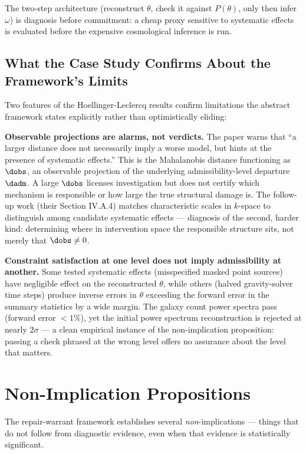 \documentclass[12pt,a4paper,twoside,openright]{book}
\theoremstyle{plain}
\theoremstyle{definition}
\theoremstyle{remark}
\begin{document}
The two-step architecture (reconstruct $\theta$, check it against $P(\theta)$, only then infer $\omega$) is diagnosis before commitment: a cheap proxy sensitive to systematic effects is evaluated before the expensive cosmological inference is run.

\subsection{What the Case Study Confirms About the Framework's Limits}

Two features of the Hoellinger-Leclercq results confirm limitations the abstract framework states explicitly rather than optimistically eliding:

\textbf{Observable projections are alarms, not verdicts.} The paper warns that ``a larger distance does not necessarily imply a worse model, but hints at the presence of systematic effects.'' This is the Mahalanobis distance functioning as $\dobs$, an observable projection of the underlying admissibility-level departure $\dadm$. A large $\dobs$ licenses investigation but does not certify which mechanism is responsible or how large the true structural damage is. The follow-up work (their Section IV.A.4) matches characteristic scales in $k$-space to distinguish among candidate systematic effects --- diagnosis of the second, harder kind: determining where in intervention space the responsible structure sits, not merely that $\dobs \neq 0$.

\textbf{Constraint satisfaction at one level does not imply admissibility at another.} Some tested systematic effects (misspecified masked point sources) have negligible effect on the reconstructed $\theta$, while others (halved gravity-solver time steps) produce inverse errors in $\theta$ exceeding the forward error in the summary statistics by a wide margin. The galaxy count power spectra pass (forward error $< 1\%$), yet the initial power spectrum reconstruction is rejected at nearly $2\sigma$ --- a clean empirical instance of the non-implication proposition: passing a check phrased at the wrong level offers no assurance about the level that matters.

\section{Non-Implication Propositions}

The repair-warrant framework establishes several \emph{non}-implications --- things that do not follow from diagnostic evidence, even when that evidence is statistically significant.
\end{document}
